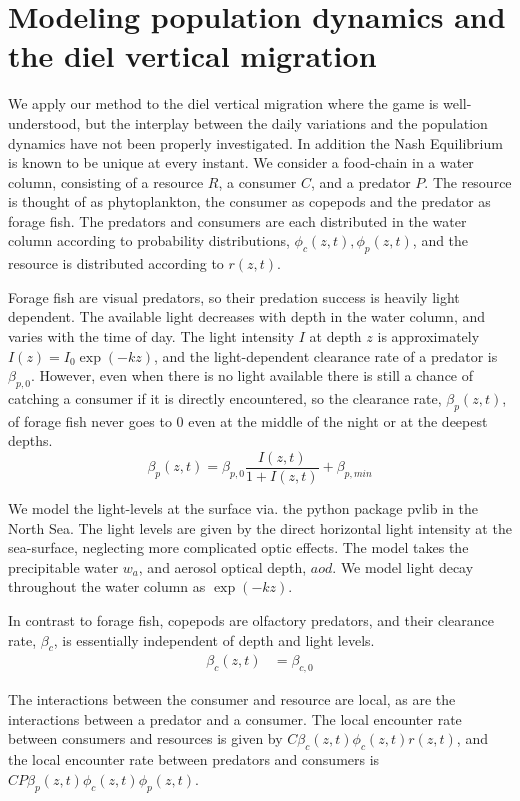 
\section{Modeling population dynamics and the diel vertical migration}
We apply our method to the diel vertical migration where the game is well-understood, but the interplay between the daily variations and the population dynamics have not been properly investigated. In addition  the Nash Equilibrium is known to be unique \citep{verticalmigration} at every instant.
We consider a food-chain in a water column, consisting of a resource $R$, a consumer $C$, and a predator $P$. The resource is thought of as phytoplankton, the consumer as copepods and the predator as forage fish. The predators and consumers are each distributed in the water column according to probability distributions, $\phi_c(z,t),\phi_p(z,t)$, and the resource is distributed according to $r(z,t)$.

Forage fish are visual predators, so their predation success is heavily light dependent. The available light decreases with depth in the water column, and varies with the time of day.
The light intensity $I$ at depth $z$ is approximately $I(z) = I_0\exp(-kz)$, and the light-dependent clearance rate of a predator is $\beta_{p,0}$.  However, even when there is no light available there is still a chance of catching a consumer if it is directly encountered,  so the clearance rate, $\beta_p(z,t)$, of forage fish never goes to 0 even at the middle of the night or at the deepest depths.
\begin{equation*}
  \beta_p(z,t) = \beta_{p,0} \frac{I(z,t)}{1+I(z,t)} + \beta_{p,min}
\end{equation*}


We model the light-levels at the surface via. the python package pvlib \citep{holmgren2018pvlib} in the North Sea. The light levels are given by the direct horizontal light intensity at the sea-surface, neglecting more complicated optic effects. The model takes the precipitable water $w_a$, and aerosol optical depth, $aod$. We model light decay throughout the water column as $\exp(-kz)$.


In contrast to forage fish, copepods are olfactory predators, and their clearance rate, $\beta_c$, is essentially independent of depth and light levels.
\begin{align*}
	\beta_c(z,t) &=  \beta_{c,0}
\end{align*}

The interactions between the consumer and resource are local, as are the interactions between a predator and a consumer. The local encounter rate between consumers and resources is given by $C\beta_c(z,t)\phi_c(z,t)r(z,t)$, and the local encounter rate between predators and consumers is $CP\beta_p(z,t)\phi_c(z,t)\phi_p(z,t)$.

